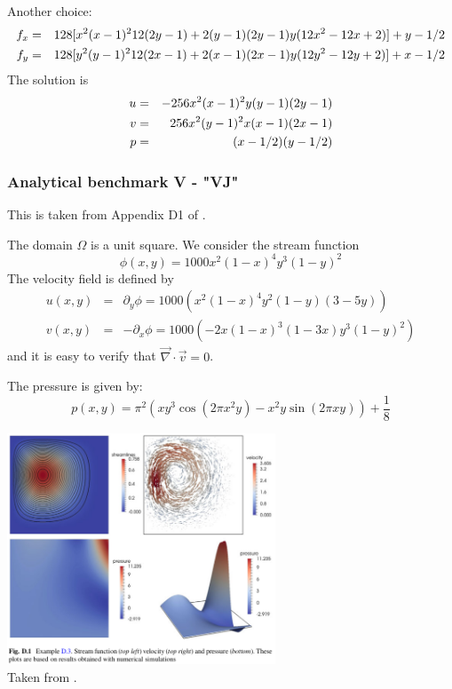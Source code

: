Another choice:
\begin{eqnarray}
f_x &=& 128[ x^2(x-1)^2 12 (2y-1) + 2 (y-1)(2y-1)y(12x^2-12x+2)  ] + y - 1/2 \nonumber\\
f_y &=& 128[ y^2(y-1)^2 12 (2x-1) + 2 (x-1)(2x-1)y(12y^2-12y+2)  ] + x - 1/2 \nonumber\\
\end{eqnarray}
The solution is
\begin{eqnarray}
u &=& -256x^2(x-1)^2y(y-1)(2y-1) \nonumber\\
v &=&  256x^2(y-1)^2x(x-1)(2x-1) \nonumber\\
p &=& (x-1/2)(y-1/2) 
\end{eqnarray}


\subsubsection{Analytical benchmark V \label{mms5} - "VJ"}

This is taken from Appendix D1 of \cite{john16}.

The domain $\Omega$ is a unit square. We consider the stream function
\[
\phi(x,y)=1000x^2(1-x)^4y^3(1-y)^2
\]
The velocity field is defined by
\begin{eqnarray}
u(x,y) &=&  \partial_y \phi = 1000(x^2(1-x)^4 y^2 (1-y)(3-5y)  ) \\
v(x,y) &=& -\partial_x \phi = 1000(-2x(1-x)^3(1-3x)y^3(1-y)^2)
\end{eqnarray}
and it is easy to verify that $\vec\nabla\cdot\vec v=0$.

The pressure is given by:
\[
p(x,y)=\pi^2( xy^3\cos(2\pi x^2y) - x^2y \sin(2\pi xy)) + \frac{1}{8}
\]

\begin{center}
\includegraphics[width=8cm]{images/mms/mms5}\\
Taken from \cite{john16}.
\end{center}


